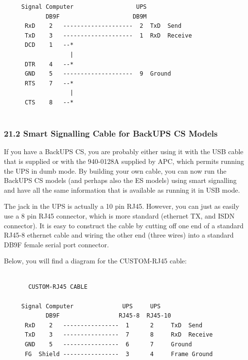 {{{{{{{{{{\begin{verbatim}
     Signal Computer                  UPS
            DB9F                     DB9M
      RxD    2   --------------------  2  TxD  Send
      TxD    3   --------------------  1  RxD  Receive
      DCD    1   --*
                   |
      DTR    4   --*
      GND    5   --------------------  9  Ground
      RTS    7   --*
                   |
      CTS    8   --*
     
\end{verbatim}
\normalsize

\label{Smart-Signalling-Cable-for-BackUPS-CS-Models}

\subsubsection*{21.2 Smart Signalling Cable for BackUPS CS Models}

\label{index-Cables_002c-Smart-Signalling-194}
\label{index-Cables_002c-BackUPS-CS-195}
If you have a BackUPS CS, you are probably either using it with the USB cable
that is supplied or with the 940-0128A supplied by APC, which permits running
the UPS in dumb mode. By building your own cable, you can now run the BackUPS
CS models (and perhaps also the ES models) using smart signalling and have all
the same information that is available as running it in USB mode.  

The jack in the UPS is actually a 10 pin RJ45. However, you can just as easily
use a 8 pin RJ45 connector, which is more standard (ethernet TX, and ISDN
connector). It is easy to construct the cable by cutting off one end of a
standard RJ45-8 ethernet cable and wiring the other end (three wires) into a
standard DB9F female serial port connector.  

Below, you will find a diagram for the CUSTOM-RJ45 cable: 

\footnotesize
\begin{verbatim}
     
       CUSTOM-RJ45 CABLE
     
     Signal Computer              UPS     UPS
            DB9F                 RJ45-8  RJ45-10
      RxD    2   ----------------  1      2     TxD  Send
      TxD    3   ----------------  7      8     RxD  Receive
      GND    5   ----------------  6      7     Ground
      FG  Shield ----------------  3      4     Frame Ground
     

\end{verbatim}}}}}}}}}}}
